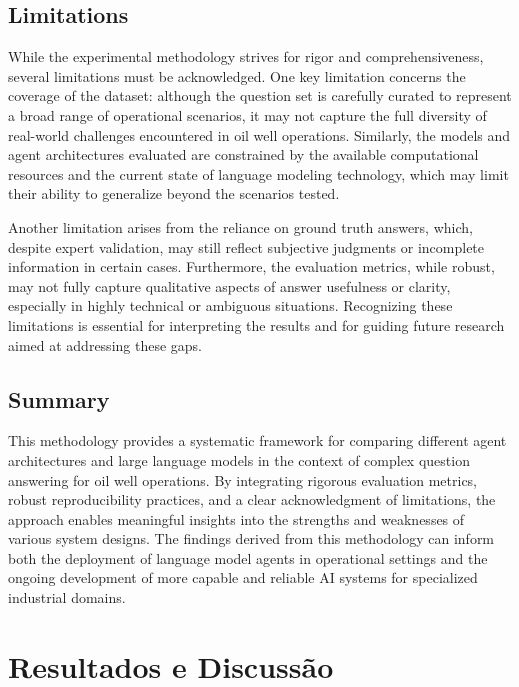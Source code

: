         \subsection{Limitations}

            While the experimental methodology strives for rigor and comprehensiveness, several limitations must be acknowledged. One key limitation concerns the coverage of the dataset: although the question set is carefully curated to represent a broad range of operational scenarios, it may not capture the full diversity of real-world challenges encountered in oil well operations. Similarly, the models and agent architectures evaluated are constrained by the available computational resources and the current state of language modeling technology, which may limit their ability to generalize beyond the scenarios tested.

            Another limitation arises from the reliance on ground truth answers, which, despite expert validation, may still reflect subjective judgments or incomplete information in certain cases. Furthermore, the evaluation metrics, while robust, may not fully capture qualitative aspects of answer usefulness or clarity, especially in highly technical or ambiguous situations. Recognizing these limitations is essential for interpreting the results and for guiding future research aimed at addressing these gaps.

        \subsection{Summary}

            This methodology provides a systematic framework for comparing different agent architectures and large language models in the context of complex question answering for oil well operations. By integrating rigorous evaluation metrics, robust reproducibility practices, and a clear acknowledgment of limitations, the approach enables meaningful insights into the strengths and weaknesses of various system designs. The findings derived from this methodology can inform both the deployment of language model agents in operational settings and the ongoing development of more capable and reliable AI systems for specialized industrial domains.


    \section{Resultados e Discussão}

